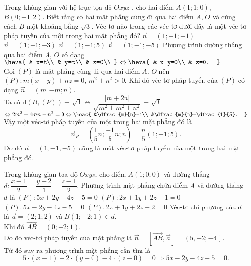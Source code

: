 \begin{ex}%
Trong không gian với hệ trục tọa độ $Oxyz$ , cho hai điểm $ A(1;1;0)$, $ B(0;-1;2)$. Biết rằng có hai mặt phẳng cùng đi qua hai điểm $ A$, $ O$ và cùng cách $ B$ một khoảng bằng $\sqrt{3}$. Véc-tơ nào trong các véc-tơ dưới đây là một véc-tơ pháp tuyến của một trong hai mặt phẳng đó?
\choice
{$\overrightarrow{n}=(1;-1;-1)$}
{$\overrightarrow{n}=(1;-1;-3)$}
{\True $\overrightarrow{n}=(1;-1;5)$}
{$\overrightarrow{n}=(1;-1;-5)$}
\loigiai
{
Phương trình đường thẳng qua hai điểm $ A$, $ O$ có dạng $\heva{
& x=t\\ 
& y=t\\ 
& z=0\\ 
}\Leftrightarrow\heva{
& x-y=0\\ 
& z=0.
}$\\
Gọi $(P)$ là mặt phẳng cùng đi qua hai điểm $ A$, $ O$ nên $(P)\colon  m\left(x-y\right)+nz=0$, $m^2+n^2>0$. Khi đó véc-tơ pháp tuyến của $(P)$ có dạng $\overrightarrow{n}=(m;-m;n)$.\\
Ta có $ \mathrm{d}\left(B,(P)\right)=\sqrt{3}\Leftrightarrow\dfrac{\left| m+2n\right|}{\sqrt{m^2+m^2+n^2}}=\sqrt{3}$ $\Leftrightarrow 2m^2-4mn-n^2=0\Leftrightarrow\hoac{
&\dfrac{m}{n}=1\\ 
&\dfrac{m}{n}=\dfrac{1}{5}.
}$\\
Vậy một véc-tơ pháp tuyến của một trong hai mặt phẳng đó là $$\overrightarrow{n}_P=\left(\dfrac{1}{5}n; \dfrac{-1}{5}n; n\right)=\dfrac{n}{5}\left(1; -1; 5\right).$$
 Do đó $\overrightarrow{n}=(1;-1;-5)$ cũng là một véc-tơ pháp tuyến của một trong hai mặt phẳng đó.}
\end{ex}

\begin{ex}%
Trong không gian tọa độ $ Oxyz$, cho điểm $A(1;0;0)$ và đường thẳng \break $ d\colon\dfrac{x-1}{2}=\dfrac{y+2}{1}=\dfrac{z-1}{2}$. Phương trình mặt phẳng chứa điểm $A$ và đường thẳng $d$ là
\choice
{$(P)\colon 5x+2y+4z-5=0$}
{$(P)\colon 2x+1y+2z-1=0$}
{\True $(P)\colon 5x-2y-4z-5=0$}
{$(P)\colon 2x+1y+2z-2=0$}
\loigiai
{
Véc-tơ chỉ phương của $ d$ là $\overrightarrow{a}=(2; 1; 2)$ và $ B(1; -2; 1)\in d$.\\
Khi đó $\overrightarrow{AB}=(0; -2; 1)$.\\
Do đó véc-tơ pháp tuyến của mặt phẳng là $\overrightarrow{n}=\left[\overrightarrow{AB},\overrightarrow{a}\right]=(5,-2;-4)$.\\
Từ đó suy ra phương trình mặt phẳng cần tìm là $$ 5\cdot(x-1)-2\cdot(y-0)-4\cdot(z-0)=0\Rightarrow 5x-2y-4z-5=0.$$}
\end{ex}


